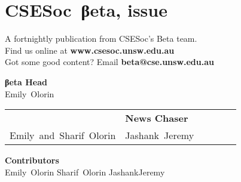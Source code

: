 \documentclass[twoside]{article}
\date{21 March 2016}
\makeatletter
\gdef\the@issue{116}
\makeatother
\begin{document}

\newpage
\maketitle\thispagestyle{mag}
\vspace*{-2em}\section*{CSE{}Soc~βeta, issue \makeatletter\the@issue}
\begin{multicols}{2}\begingroup\raggedcolumns
\begin{center}
A fortnightly publication from CSESoc's Beta team.\\
Find us online at \textbf{www.csesoc.unsw.edu.au}\\
Got some good content? Email \textbf{beta@cse.unsw.edu.au}\\
\par{\bf\sffamily βeta Head}\\ Emily~Olorin
\par\begin{tabular}{>{\raggedleft}p{0.5\linewidth}>{\raggedright}p{0.5\linewidth}}
{\bf\sffamily Puzzle Wrangler} & {\bf\sffamily News Chaser}\tabularnewline
Emily~and~Sharif~Olorin & Jashank~Jeremy\tabularnewline
\end{tabular}
\par{\bf\sffamily Contributors}\\
  Emily~Olorin\hsp{}
  Sharif~Olorin\hsp{}
  JashankJeremy\hsp{}
\end{center}
\columnbreak\malcontents\vfill\endgroup
\end{multicols}\LRmulticolcolumns
\vspace*{-4em}\begin{multicols}{2}


\end{multicols}
\end{document}
